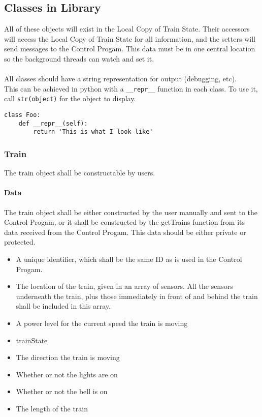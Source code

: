 \documentclass[a4paper,11pt,notitlepage]{article}
\def\CS{Control Progam\xspace}
\def\LC{Local Copy of Train State\xspace}
\begin{document}
\subsection{Classes in Library}
All of these objects will exist in the \LC. Their accessors will access the \LC for all information, and the setters will send messages to the \CS. This data must be in one central location so the background threads can watch and set it. \\ \\
All classes should have a string representation for output (debugging, etc).\\
This can be achieved in python with a \verb!__repr__! function in each class. To use it, call \verb!str(object)! for the object to display.
\begin{verbatim}
class Foo:
    def __repr__(self):
        return 'This is what I look like'
\end{verbatim}

\subsubsection{Train}
The train object shall be constructable by users.
\paragraph{Data}
The train object shall be either constructed by the user manually and sent to the \CS, or it shall be constructed by the getTrains function from its data received from the \CS. This data should be either private or protected.
\begin{itemize}
\item A unique identifier, which shall be the same ID as is used in the \CS.
\item The location of the train, given in an array of sensors. All the sensors underneath the train, plus those immediately in front of and behind the train shall be included in this array. 
\item A power level for the current speed the train is moving
\item trainState
\item The direction the train is moving
\item Whether or not the lights are on
\item Whether or not the bell is on
\item The length of the train
\end{itemize}
\end{document}
